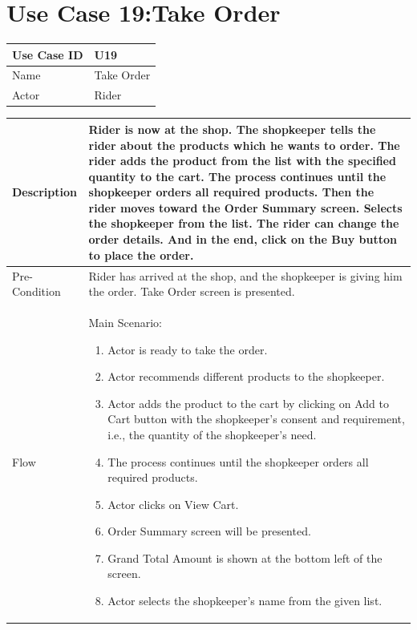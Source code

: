 \documentclass[12pt,a4paper]{report}
\begin{document}
\section{Use Case 19:Take Order}

\begin{tabular}{ | m{3cm} | m{12cm}| } \hline
Use Case ID &  U19 \\\hline

Name  	    &  Take Order \\ \hline

Actor     	& Rider \\ \hline
\end{tabular}
\begin{tabular}{ | m{3cm} | m{12cm}| } \hline
Description &  Rider is now at the shop. The shopkeeper tells the rider about the products which he wants to order. The rider adds the product from the list with the specified quantity to the cart. The process continues until the shopkeeper orders all required products. Then the rider moves toward the Order Summary screen. Selects the shopkeeper from the list. The rider can change the order details. And in the end, click on the Buy button to place the order. \\ \hline

Pre-Condition &  Rider has arrived at the shop, and the shopkeeper is giving him the order. Take Order screen is presented.  \\ \hline

Flow & Main Scenario:

\begin{enumerate}
\item Actor is ready to take the order.

\item Actor recommends different products to the shopkeeper.

\item Actor adds the product to the cart by clicking on Add to Cart button with the shopkeeper's consent and requirement, i.e., the quantity of the shopkeeper's need.

\item The process continues until the shopkeeper orders all required products.


\item Actor clicks on View Cart.

\item Order Summary screen will be presented.
\item Grand Total Amount is shown at the bottom left of the screen.
\item Actor selects the shopkeeper's name from the given list.


\end{enumerate}
\end{tabular}
\end{document}
